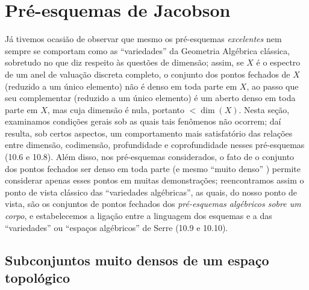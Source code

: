 \section{Pré-esquemas de Jacobson}
\label{section:IV.10}

Já tivemos ocasião de observar  que mesmo os
pré-esquemas \emph{excelentes}  nem sempre se comportam como as
``variedades'' da Geometria Algébrica clássica, sobretudo no que diz respeito
às questões de dimensão; assim, se $X$ é o espectro de um anel de valuação
discreta completo, o conjunto dos pontos fechados de $X$ (reduzido a um único
elemento) não é denso em toda parte em $X$, ao passo que seu complementar
(reduzido a um único elemento) é um aberto denso em toda parte em $X$, mas cuja
dimensão é nula, portanto $<\dim(X)$. Nesta seção, examinamos condições gerais
sob as quais tais fenômenos não ocorrem; daí resulta, sob certos aspectos, um
comportamento mais satisfatório das relações entre dimensão, codimensão,
profundidade e coprofundidade nesses pré-esquemas (10.6 e 10.8). Além disso,
nos pré-esquemas considerados, o fato de o conjunto dos pontos fechados ser
denso em toda parte (e mesmo ``muito denso'' ) permite
considerar apenas esses pontos em muitas demonstrações; reencontramos assim o
ponto de vista clássico das ``variedades algébricas'', as quais, do nosso ponto
de vista, são os conjuntos de pontos fechados dos \emph{pré-esquemas algébricos
sobre um corpo}, e estabelecemos a ligação entre a linguagem dos esquemas e a
das ``variedades'' ou ``espaços algébricos'' de Serre (10.9 e 10.10).

\subsection{Subconjuntos muito densos de um espaço topológico}
\label{subsection:IV.10.1}

